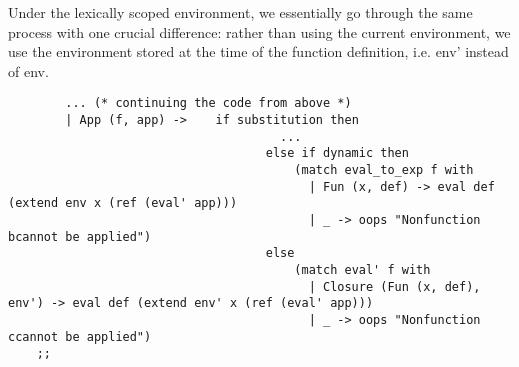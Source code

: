 \documentclass[submit]{harvardml}
\begin{document}
\begin{itemize}
	Under the lexically scoped environment, we essentially go through the same process with one crucial difference: rather than using the current environment, we use the environment stored at the time of the function definition, i.e. env' instead of env.

	\begin{lstlisting}
		... (* continuing the code from above *)
		| App (f, app) ->    if substitution then
									  ...
									else if dynamic then
										(match eval_to_exp f with
										  | Fun (x, def) -> eval def (extend env x (ref (eval' app)))
										  | _ -> oops "Nonfunction bcannot be applied")
									else
										(match eval' f with
										  | Closure (Fun (x, def), env') -> eval def (extend env' x (ref (eval' app)))
										  | _ -> oops "Nonfunction ccannot be applied")
    ;;
	\end{lstlisting}
	
\end{itemize}
\end{document}
